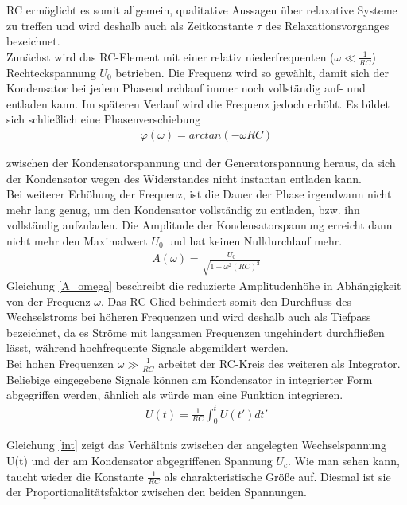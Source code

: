 RC ermöglicht es somit allgemein, qualitative Aussagen über relaxative Systeme zu treffen und wird deshalb auch als  Zeitkonstante $\tau$ des Relaxationsvorganges bezeichnet.\\

Zunächst wird das RC-Element mit einer relativ niederfrequenten ($\omega\ll\frac{1}{RC}$) Rechteckspannung $U_0$ betrieben. Die Frequenz wird so gewählt, damit sich der Kondensator bei jedem Phasendurchlauf immer noch vollständig auf- und entladen kann.
Im späteren Verlauf wird die Frequenz jedoch erhöht. Es bildet sich schließlich eine Phasenverschiebung 
\begin{align}
\varphi(\omega)=arctan(-\omega RC)
\label{varphi}
\end{align}

zwischen der Kondensatorspannung und der Generatorspannung heraus, da sich der Kondensator wegen des Widerstandes nicht instantan entladen kann.\\

Bei weiterer Erhöhung der Frequenz, ist die Dauer der Phase irgendwann nicht mehr lang genug, um den Kondensator vollständig zu entladen, bzw. ihn vollständig aufzuladen.
Die Amplitude der Kondensatorspannung erreicht dann nicht mehr den Maximalwert $U_0$ und hat keinen Nulldurchlauf mehr.
\begin{align}
A(\omega)= \frac{U_0}{\sqrt{1+\omega^2(RC)^2}}
\label{A_omega}
\end{align}
Gleichung \eqref{A_omega} beschreibt die reduzierte Amplitudenhöhe in Abhängigkeit von der Frequenz $\omega$.
Das RC-Glied behindert somit den Durchfluss des Wechselstroms bei höheren Frequenzen und wird deshalb auch als Tiefpass bezeichnet, da es Ströme mit langsamen Frequenzen ungehindert durchfließen lässt, während hochfrequente Signale abgemildert werden.\\

Bei hohen Frequenzen $\omega\gg\frac{1}{RC}$ arbeitet der RC-Kreis des weiteren als Integrator. Beliebige eingegebene Signale können am Kondensator in integrierter Form abgegriffen werden, ähnlich als würde man eine Funktion integrieren.
\begin{align}
U(t)=\frac{1}{RC} \int_0^t U(t')dt'
\label{int}
\end{align}

Gleichung \eqref{int} zeigt das Verhältnis zwischen der angelegten Wechselspannung U(t) und der am Kondensator abgegriffenen Spannung $U_c$. 
Wie man sehen kann, taucht wieder die Konstante $\frac{1}{RC}$ als charakteristische Größe auf. Diesmal ist sie der Proportionalitätsfaktor zwischen den beiden Spannungen.\\

